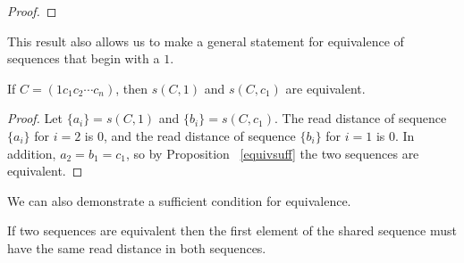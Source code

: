 \documentclass[runningheads,a4paper]{llncs}
\begin{document}
\begin{proof}



\end{proof}

This result also allows us to make a general statement for equivalence of sequences that begin with a $1$.
\begin{corollary} If $C = (1 c_1 c_2 \cdots c_n)$, then $s(C, 1)$ and $s(C, c_1)$ are equivalent.
\end{corollary}
\begin{proof}
Let $\{a_i\} = s(C, 1)$ and $\{b_i\} = s(C, c_1)$. The read distance of sequence $\{a_i\}$ for $i=2$ is 0, and the read distance of sequence $\{b_i\}$ for $i = 1$ is 0. In addition, $a_2 = b_1 = c_1$, so by Proposition ~\ref{equivsuff} the two sequences are equivalent.
\end{proof}

We can also demonstrate a sufficient condition for equivalence. 
\begin{theorem}
\label{thm:readfirst}
If two sequences are equivalent then the first element of the shared sequence must have the same read distance in both sequences.
\end{theorem}
\end{document}
